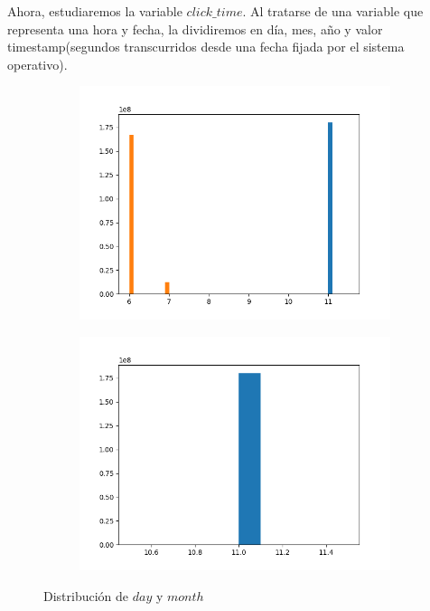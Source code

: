 Ahora, estudiaremos la variable $click\_time$. Al tratarse de una variable que representa una hora y fecha, la dividiremos en día, mes, año y valor timestamp(segundos transcurridos desde una fecha fijada por el sistema operativo).
\begin{figure}[H]
	\centering
	\begin{subfigure}{.5\textwidth}
		\centering
		\includegraphics[scale=0.45]{img/click_time_day_distribution.png}
	\end{subfigure}%
	\begin{subfigure}{.5\textwidth}
		\centering
		\includegraphics[scale=0.45]{img/click_time_month_distribution.png}
	\end{subfigure}
	\caption{Distribución de $day$ y $month$}
\end{figure}
